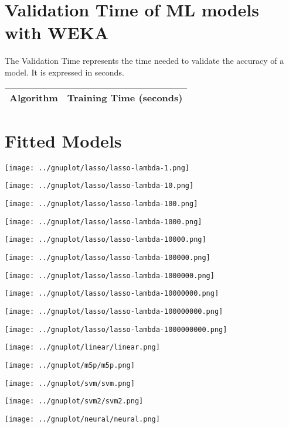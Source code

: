 \documentclass[10pt,a4paper]{article}
\begin{document}
\section{Validation Time of ML models with WEKA }

The Validation Time represents the time needed to validate the accuracy of a model. It is expressed in seconds.

\begin{center}
\begin{tabular}{cc}
\toprule
\textbf{Algorithm} & \textbf{Training Time (seconds)} \\
\midrule

\bottomrule
\end{tabular}
\end{center}



\section{Fitted Models}

\texttt{[image: ../gnuplot/lasso/lasso-lambda-1.png]}

\texttt{[image: ../gnuplot/lasso/lasso-lambda-10.png]}

\texttt{[image: ../gnuplot/lasso/lasso-lambda-100.png]}

\texttt{[image: ../gnuplot/lasso/lasso-lambda-1000.png]}

\texttt{[image: ../gnuplot/lasso/lasso-lambda-10000.png]}

\texttt{[image: ../gnuplot/lasso/lasso-lambda-100000.png]}

\texttt{[image: ../gnuplot/lasso/lasso-lambda-1000000.png]}

\texttt{[image: ../gnuplot/lasso/lasso-lambda-10000000.png]}

\texttt{[image: ../gnuplot/lasso/lasso-lambda-100000000.png]}

\texttt{[image: ../gnuplot/lasso/lasso-lambda-1000000000.png]}

\texttt{[image: ../gnuplot/linear/linear.png]}

\texttt{[image: ../gnuplot/m5p/m5p.png]}

\texttt{[image: ../gnuplot/svm/svm.png]}

\texttt{[image: ../gnuplot/svm2/svm2.png]}

\texttt{[image: ../gnuplot/neural/neural.png]}
\end{document}
